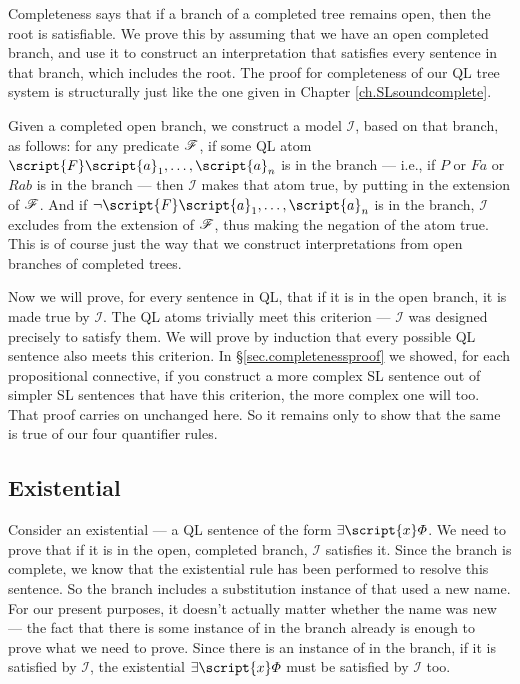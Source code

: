 Completeness says that if a branch of a completed tree remains open, then the root is satisfiable. We prove this by assuming that we have an open completed branch, and use it to construct an interpretation that satisfies every sentence in that branch, which includes the root. The proof for completeness of our QL tree system is structurally just like the one given in Chapter \ref{ch.SLsoundcomplete}.

Given a completed open branch, we construct a model $\mathcal{I}$, based on that branch, as follows: for any predicate $\mathscr{F}$\!, if some QL atom $\script{F}\script{a}_{1}, \ldots, \script{a}_{n}$ is in the branch --- i.e., if $P$ or $Fa$ or $Rab$ is in the branch --- then $\mathcal{I}$ makes that atom true, by putting  in the extension of $\mathscr{F}$\!. And if $\enot \script{F}\script{a}_{1}, \ldots, \script{a}_{n}$ is in the branch, $\mathcal{I}$ excludes  from the extension of $\mathscr{F}$\!, thus making the negation of the atom true. This is of course just the way that we construct interpretations from open branches of completed trees.

Now we will prove, for every sentence in QL, that if it is in the open branch, it is made true by $\mathcal{I}$. The QL atoms trivially meet this criterion --- $\mathcal{I}$ was designed precisely to satisfy them. We will prove by induction that every possible QL sentence also meets this criterion. In \S\ref{sec.completenessproof} we showed, for each propositional connective, if you construct a more complex SL sentence out of simpler SL sentences that have this criterion, the more complex one will too. That proof carries on unchanged here. So it remains only to show that the same is true of our four quantifier rules.

\subsection{Existential}

Consider an existential --- a QL sentence of the form $\exists \script{x} \metaA{}$. We need to prove that if it is in the open, completed branch, $\mathcal{I}$ satisfies it. Since the branch is complete, we know that the existential rule has been performed to resolve this sentence. So the branch includes a substitution instance of \metaA{} that used a new name. For our present purposes, it doesn't actually matter whether the name was new --- the fact that there is some instance of \metaA{} in the branch already is enough to prove what we need to prove. Since there is an instance of \metaA{} in the branch, if it is satisfied by $\mathcal{I}$, the existential $\exists \script{x} \metaA{}$ must be satisfied by $\mathcal{I}$ too.

